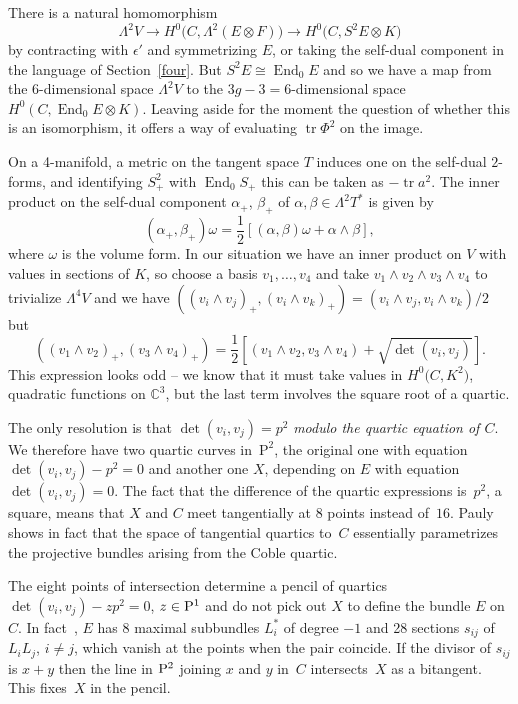 \documentclass[10pt,a4paper]{amsart}
\numberwithin{equation}{section}
\begin{document}
There is a natural homomorphism
\[ \Lambda^2V\rightarrow H^0\big(C, \Lambda^2(E\otimes F)\big)\rightarrow H^0\big(C, S^2E\otimes K\big)\]
by contracting with $\epsilon'$ and symmetrizing $E$, or taking the self-dual component in the language of Section~\ref{four}. But $S^2E\cong \operatorname{End}_0 E$ and so we have a map from the $6$-dimensional space $\Lambda^2V$ to the $3g-3=6$-dimensional space $H^0(C, \operatorname{End}_0 E\otimes K)$. Leaving aside for the moment the question of whether this is an isomorphism, it offers a way of evaluating $\operatorname{tr} \Phi^2$ on the image.

On a 4-manifold, a metric on the tangent space $T$ induces one on the self-dual $2$-forms, and identifying $S^2_+$ with $ \operatorname{End} _0 S_+$ this can be taken as $-\operatorname{tr} a^2$. The inner product on the self-dual component $\alpha_+$, $\beta_+$ of $\alpha,\beta\in \Lambda^2T^*$ is given by
\[
(\alpha_+,\beta_+)\omega=\frac{1}{2}\left[(\alpha,\beta)\omega+\alpha\wedge\beta\right],
\]
where $\omega$ is the volume form.
In our situation we have an inner product on $V$ with values in sections of $K$, so choose a basis $v_1,\dots, v_4$ and take $v_1\wedge v_2\wedge v_3\wedge v_4$ to trivialize $\Lambda^4V$ and we have $((v_i\wedge v_j)_+,(v_i\wedge v_k)_+)=(v_i\wedge v_j,v_i\wedge v_k)/2$ but
\[
((v_1\wedge v_2)_+,(v_3\wedge v_4)_+)=\frac{1}{2}\left[(v_1\wedge v_2,v_3\wedge v_4)+\sqrt{\det(v_i,v_j)} \right].
\]
This expression looks odd -- we know that it must take values in $H^0\big(C,K^2\big)$, quadratic functions on ${\mathbb C}^3$, but the last term involves the square root of a quartic.

The only resolution is that $\det(v_i,v_j)= p^2$ {\it modulo the quartic equation of $C$}. We therefore have two quartic curves in~$\mathrm{P}^2$, the original one with equation $\det(v_i,v_j)- p^2=0$ and another one $X$, depending on $E$ with equation $\det(v_i,v_j)=0$. The fact that the difference of the quartic expressions is~$p^2$, a square, means that $X$ and $C$ meet tangentially at $8$ points instead of~$16$. Pauly shows in fact that the space of tangential quartics to~$C$ essentially parametrizes the projective bundles arising from the Coble quartic.

\begin{Remark}
The eight points of intersection determine a pencil of quartics $\det(v_i,v_j)- zp^2=0$, $z\in {\rm P}^1$ and do not pick out $X$ to define the bundle $E$ on $C$. In fact~\cite{Pauly}, $E$ has 8 maximal subbundles $L^*_i$ of degree $-1$ and 28 sections $s_{ij}$ of $L_iL_j$, $i\ne j$, which vanish at the points when the pair coincide. If the divisor of $s_{ij}$ is $x+y$ then the line in ${\rm P}^2$ joining $x$ and $y$ in~$C$ intersects~$X$ as a bitangent. This fixes~$X$ in the pencil.
\end{Remark}
\end{document}
